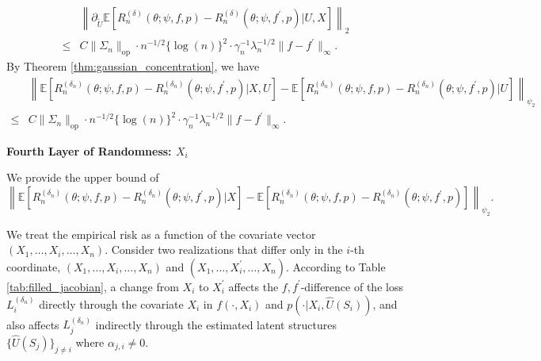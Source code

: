\documentclass[12pt]{article}
\newcommand{\E}{\mathbb{E}}
\begin{document}
\begin{align*}
    &\left\|\partial_{ \widetilde U}\E\left[R_n^{(\delta)}(\theta;\psi,f,p)-R_n^{(\delta)}(\theta;\psi,f^\prime,p)\bigg| U,X\right]\right\|_2\\
    \leq & C\|\Sigma_n\|_{\mathrm{op}}\cdot n^{-1/2}\{\log(n)\}^2\cdot\gamma_n^{-1}\lambda_n^{-1/2}\|f-f^\prime\|_\infty.
\end{align*}
By Theorem \ref{thm:gaussian_concentration}, we have
\begin{align*}
    &\left\|\E\left[R_n^{(\delta_n)}(\theta;\psi,f,p)-R_n^{({\delta_n})}(\theta;\psi,f^\prime,p)|X,U\right]-\E\left[R_n^{(\delta_n)}(\theta;\psi,f,p)-R_n^{({\delta_n})}(\theta;\psi,f^\prime,p)|U\right]\right\|_{\psi_2}\\
    \leq & C\|\Sigma_n\|_{\mathrm{op}}\cdot n^{-1/2}\{\log(n)\}^2\cdot\gamma_n^{-1}\lambda_n^{-1/2}\|f-f^\prime\|_\infty.
\end{align*}



\noindent\textbf{Fourth Layer of Randomness: $X_i$}

\noindent We provide the upper bound of
$$\left\|\E\left[R_n^{(\delta_n)}(\theta;\psi,f,p)-R_n^{({\delta_n})}(\theta;\psi,f^\prime,p)|X\right]-\E\left[R_n^{(\delta_n)}(\theta;\psi,f,p)-R_n^{({\delta_n})}(\theta;\psi,f^\prime,p)\right]\right\|_{\psi_2}.$$

We treat the empirical risk as a function of the covariate vector $(X_1, \ldots,X_i,\ldots, X_n)$. Consider two realizations that differ only in the $i$-th coordinate, $(X_1, \ldots,X_i,\ldots, X_n)$ and $(X_1, \ldots,X_i^\prime,\ldots, X_n)$. According to Table \ref{tab:filled_jacobian}, a change from $X_i$ to $X_i^\prime$ affects the $f,f^\prime$-difference of the loss $L_i^{(\delta_n)}$ directly through the covariate $X_i$ in $f(\cdot,X_i)$ and $p(\cdot|X_i,\widehat U(S_i))$, and also affects $L_j^{(\delta_n)}$ indirectly through the estimated latent structures $\{\widehat U(S_j)\}_{j\neq i}$ where $\alpha_{j,i}\neq 0$.
\end{document}
